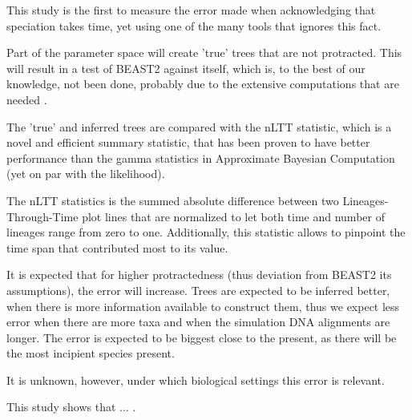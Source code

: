 
This study is the first to measure the error made when acknowledging that
speciation takes time, yet using one of the many tools that ignores this
fact.



Part of the parameter space will create 'true' trees that are not protracted.
This will result in a test of BEAST2 against itself, which is, to the best
of our knowledge, not been done, probably due to the extensive computations
that are needed .


The 'true' and inferred trees are compared with the nLTT statistic, which
is a novel and efficient summary statistic, that has been proven to have
better performance than the gamma statistics in Approximate
Bayesian Computation \cite{janzen2015approximate} (yet on par with the likelihood).

The nLTT statistics is the summed absolute difference between two 
Lineages-Through-Time plot lines that are normalized to 
let both time and number of lineages
range from zero to one.
Additionally, this statistic allows to pinpoint the time span that contributed
most to its value.


It is expected that for higher protractedness (thus deviation from BEAST2
its assumptions), the error will increase.
Trees are expected to be inferred better, when there is more information
available to construct them, thus we expect less error when there are more
taxa and when the simulation DNA alignments are longer.
The error is expected to be biggest close to the present, as there will
be the most incipient species present.
 
It is unknown, however, under which biological settings this error is relevant.


This study shows that ... .
